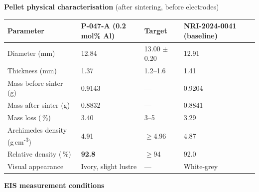 
\begin{tcolorbox}[notebox, title={\faMicroscope\quad Raw Observations \& Measurements}]

  \textbf{Pellet physical characterisation} (after sintering, before electrodes)

  \vspace{4pt}
  \begin{tabularx}{\linewidth}{@{}lXXX@{}}
    \toprule
    \rowcolor{LightSteel}
    \textbf{\small Parameter} & \textbf{\small P-047-A (0.2\,mol\% Al)} &
    \textbf{\small Target} & \textbf{\small NRI-2024-0041 (baseline)} \\
    \midrule
    Diameter (mm)                    & 12.84       & 13.00 $\pm$ 0.20 & 12.91 \\
    Thickness (mm)                   & 1.37        & 1.2--1.6         & 1.41  \\
    Mass before sinter (g)           & 0.9143      & ---              & 0.9204 \\
    Mass after sinter (g)            & 0.8832      & ---              & 0.8841 \\
    Mass loss (\,\%)                 & 3.40        & 3--5             & 3.29  \\
    Archimedes density (g\,cm\textsuperscript{-3}) & 4.91 & $\geq$4.96 & 4.87 \\
    Relative density (\,\%)         & \textbf{92.8} & $\geq$94        & 92.0  \\
    Visual appearance                & Ivory, slight lustre & --- & White-grey \\
    \bottomrule
  \end{tabularx}

  \vspace{10pt}
  \textbf{EIS measurement conditions}


\end{tcolorbox}
